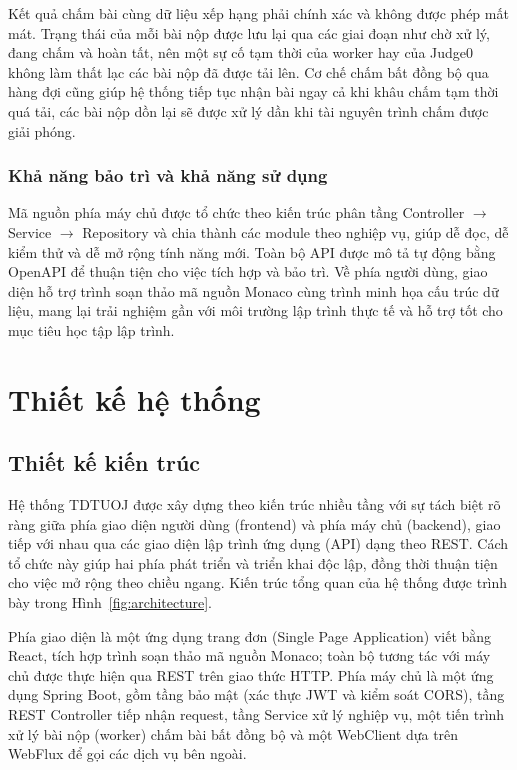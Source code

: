 \documentclass[12pt, a4paper]{report}
\begin{document}
Kết quả chấm bài cùng dữ liệu xếp hạng phải chính xác và không được phép mất mát. Trạng thái của
mỗi bài nộp được lưu lại qua các giai đoạn như chờ xử lý, đang chấm và hoàn tất, nên một sự
cố tạm thời của worker hay của Judge0 không làm thất lạc các bài nộp đã được tải lên. Cơ chế chấm bất
đồng bộ qua hàng đợi cũng giúp hệ thống tiếp tục nhận bài ngay cả khi khâu chấm tạm thời quá
tải, các bài nộp dồn lại sẽ được xử lý dần khi tài nguyên trình chấm được giải phóng.

\subsection{Khả năng bảo trì và khả năng sử dụng}

Mã nguồn phía máy chủ được tổ chức theo kiến trúc phân tầng Controller $\to$ Service $\to$ Repository
và chia thành các module theo nghiệp vụ, giúp dễ đọc, dễ kiểm thử và dễ mở rộng tính năng mới.
Toàn bộ \ac{API} được mô tả tự động bằng OpenAPI để thuận tiện cho việc tích hợp và bảo trì.
Về phía người dùng, giao diện hỗ trợ trình soạn thảo mã nguồn Monaco cùng trình minh họa cấu
trúc dữ liệu, mang lại trải nghiệm gần với môi trường lập trình thực tế và hỗ trợ tốt cho mục
tiêu học tập lập trình.

\chapter{Thiết kế hệ thống}

\section{Thiết kế kiến trúc}

Hệ thống TDTUOJ được xây dựng theo kiến trúc nhiều tầng với sự tách biệt rõ ràng giữa phía
giao diện người dùng (frontend) và phía máy chủ (backend), giao tiếp với nhau qua các giao
diện lập trình ứng dụng (\ac{API}) dạng theo \ac{REST}. Cách tổ chức này giúp hai phía phát triển
và triển khai độc lập, đồng thời thuận tiện cho việc mở rộng theo chiều ngang. Kiến trúc tổng
quan của hệ thống được trình bày trong Hình~\ref{fig:architecture}.

Phía giao diện là một ứng dụng trang đơn (Single Page Application) viết bằng React, tích hợp
trình soạn thảo mã nguồn Monaco; toàn bộ tương tác với máy chủ được thực hiện qua \ac{REST}
trên giao thức \ac{HTTP}. Phía máy chủ là một ứng dụng Spring Boot, gồm tầng bảo mật (xác thực
\ac{JWT} và kiểm soát \ac{CORS}), tầng REST Controller tiếp nhận request, tầng Service xử lý
nghiệp vụ, một tiến trình xử lý bài nộp (worker) chấm bài bất đồng bộ và một WebClient dựa trên
WebFlux để gọi các dịch vụ bên ngoài.
\end{document}
